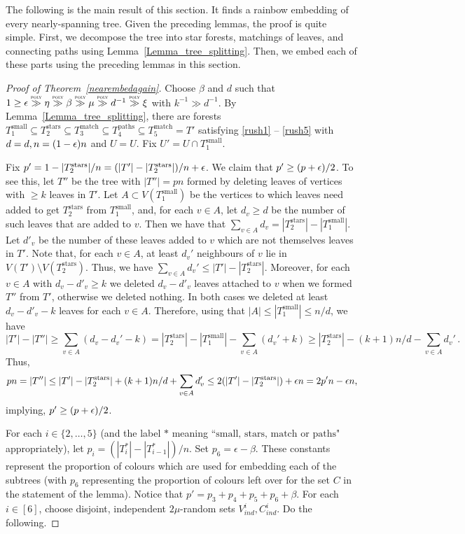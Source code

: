 The following is the main result of this section. It finds a rainbow embedding of every nearly-spanning tree. Given the preceding lemmas, the proof is quite simple. First, we decompose the tree into star forests, matchings of leaves, and connecting paths using  Lemma~\ref{Lemma_tree_splitting}. Then, we embed each of these parts using the preceding lemmas in this section.
\begin{proof}[Proof of Theorem~\ref{nearembedagain}]
Choose $\beta$ and $d$ such that $1\geq  \eps\gg  \eta\gg \beta \gg  \mu\gg  d^{-1}\gg  \xi$ with $k^{-1}\gg d^{-1}$.
By Lemma~\ref{Lemma_tree_splitting}, there are forests $T_1^{\mathrm{small}}\subseteq T_2^{\mathrm{stars}}\subseteq T_3^{\mathrm{match}}\subseteq T_4^{\mathrm{paths}}\subseteq T_5^{\mathrm{match}}=T'$ satisfying \ref{rush1} -- \ref{rush5} with  $d=d, n=(1-\epsilon)n$ and $U=U$. Fix $U'=U\cap T_1^{\mathrm{small}}$.

Fix $p'=1-|T_2^{\mathrm{stars}}|/n=(|T'|-|T_2^{\mathrm{stars}}|)/n+\epsilon$. We claim that $p'\geq (p+\epsilon)/2$. To see this, let $T''$ be the tree with $|T''|=pn$ formed by deleting leaves of vertices with $\geq k$ leaves in $T'$. Let $A\subset V(T_1^{\mathrm{small}})$ be the vertices to which leaves need added to get $T_2^{\mathrm{stars}}$ from $T_1^{\mathrm{small}}$, and, for each $v\in A$, let $d_v\geq d$ be the number of such leaves that are added to $v$. Then we have that $\sum_{v\in A} d_v=|T_2^{\mathrm{stars}}|-|T_1^{\mathrm{small}}|$.
Let $d'_v$ be the number of these leaves added to $v$ which are not themselves leaves in $T'$. 
Note that, for each $v\in A$, at least $d_v'$ neighbours of $v$ lie in $V(T')\setminus V(T_2^{\mathrm{stars}})$. Thus, we have
$\sum_{v\in A}d_v'\leq |T'|-|T_2^{\mathrm{stars}}|$. Moreover, for each $v\in A$ with $d_v-d'_v \geq k$ we deleted  $d_v-d'_v$ leaves attached to $v$ when we formed $T''$ from $T'$, otherwise we deleted nothing. In both cases we deleted at least $d_v-d'_v-k$ leaves for each $v \in A$.
Therefore, using that $|A| \leq|T_1^{\mathrm{small}}|\leq n/d$, we have
$$|T'|-|T''| \geq \sum_{v\in A}(d_v-d_v'-k)=|T_2^{\mathrm{stars}}|-|T_1^{\mathrm{small}}|-\sum_{v\in A}(d_v'+k) \geq |T_2^{\mathrm{stars}}|-(k+1)n/d-\sum_{v\in A}d_v'\,.$$
Thus,
$$
pn= |T''| \leq |T'|-|T_2^{\mathrm{stars}}|+(k+1)n/d+\sum_{v\in A}d_v'\leq 2(|T'|-|T_2^{\mathrm{stars}}|)+\epsilon n= 2p'n-\epsilon n,
$$
implying, $p'\geq (p+\epsilon)/2$.

For each $i\in \{2, \dots, 5\}$ (and the label $*$ meaning ``$\mathrm{small},\, \mathrm{stars},\,  \mathrm{match}$ or $\mathrm{paths}$" appropriately), let $p_i=(|T_i^*|-|T_{i-1}^*|)/n$. Set $p_6=\epsilon-\beta.$
These constants represent the proportion of colours which are used for embedding each of the subtrees (with $p_6$ representing the proportion of colours left over for the set $C$ in the statement of the lemma).
Notice that $p'=p_3+p_4+p_5+p_6+\beta$.
For each $i\in [6]$, choose disjoint, independent $2\mu$-random sets $V^{i}_{ind}, C_{ind}^i$. Do the following.


\end{proof}
